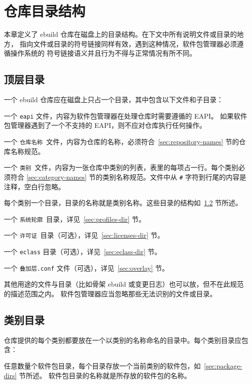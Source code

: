 \chapter{仓库目录结构}

本章定义了 ebuild 仓库在磁盘上的目录结构。在下文中所有说明文件或目录的地方，
指向文件或目录的符号链接同样有效，遇到这种情况，软件包管理器必须遵循操作系统的
符号链接语义并且行为不得与正常情况有所不同。

\section{顶层目录}

一个 ebuild 仓库应在磁盘上只占一个目录，其中包含以下文件和子目录：
\begin{compactitem}
\item 一个 \texttt{eapi} 文件，内容为软件包管理器在处理仓库时需要遵循的 EAPI。
    如果软件包管理器遇到了一个不支持的 EAPI，则不应对仓库执行任何操作。
\item 一个 \texttt{仓库名称}\ 文件，内容为仓库的名称，必须符合~\ref{sec:repository-names}
    节的仓库名称规范。
\item 一个 \texttt{类别}\ 文件，内容为一张仓库中类别的列表，表里的每项占一行。每个类别必须符合
    \ref{sec:category-names} 节的类别名称规范。文件中从 \texttt{\#} 字符到行尾的内容是注释，空白行忽略。
\item 每个类别一个目录，目录的名称就是类别名称。这些目录的结构如~\ref{sec:category-dirs} 节所述。
\item 一个 \texttt{系统轮廓}\ 目录，详见~\ref{sec:profiles-dir} 节。
\item 一个 \texttt{许可证}\ 目录（可选），详见~\ref{sec:licenses-dir} 节。
\item 一个 \texttt{eclass} 目录（可选），详见~\ref{sec:eclass-dir} 节。
\item 一个 \texttt{叠加层.conf} 文件（可选），详见~\ref{sec:overlay} 节。
\end{compactitem}

其他用途的文件与目录（比如骨架 ebuild 或变更日志）也可以放，但不在此规范的描述范围之内。
软件包管理器应当忽略那些无法识别的文件或目录。

\section{类别目录}
\label{sec:category-dirs}

仓库提供的每个类别都要放在一个以类别的名称命名的目录中。每个类别目录应包含：
\begin{compactitem}
\item 任意数量个软件包目录，每个目录存放一个当前类别的软件包，如~\ref{sec:package-dirs} 节所述。
    软件包目录的名称就是所存放的软件包的名称。
\end{compactitem}

